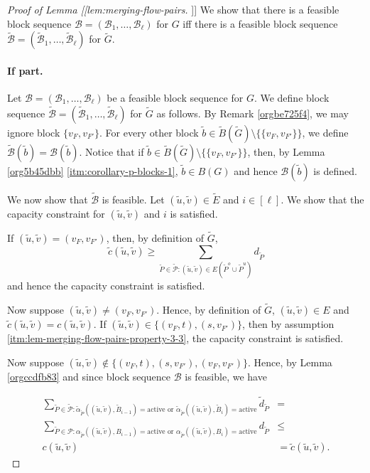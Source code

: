 \documentclass[fontsize=11pt,paper=a4]{book}
\begin{document}
\begin{proof}[Proof of Lemma [[lem:merging-flow-pairs]]]
We show that there is a feasible block sequence \(\mathcal{B}=(\mathscr{B}_1,\dots,\mathscr{B}_{\ell})\) for \(G\) iff there is a feasible block sequence \(\tilde{\mathcal{B}}=(\tilde{\mathscr{B}}_1,\dots,\tilde{\mathscr{B}}_{\ell})\) for \(\tilde{G}\).

\paragraph{If part.}
Let \(\mathcal{B}=(\mathscr{B}_1,\dots,\mathscr{B}_{\ell})\) be a feasible block sequence for \(G\).
We define block sequence \(\tilde{\mathcal{B}}=(\tilde{\mathscr{B}}_1,\dots,\tilde{\mathscr{B}}_{\ell})\) for \(\tilde{G}\) as follows.
By Remark \ref{orgbe725f4}, we may ignore block \(\{v_F,v_{F'}\}\).
For every other block \(\tilde{b}\in\tilde{B}(\tilde{G})\setminus\{\{v_F,v_{F'}\}\}\), we define \(\tilde{\mathcal{B}}(\tilde{b})=\mathcal{B}(\tilde{b})\).
Notice that if \(\tilde{b}\in\tilde{B}(\tilde{G})\setminus\{\{v_F,v_{F'}\}\}\), then, by Lemma \ref{org5b45dbb} \ref{itm:corollary-p-blocks-1}, \(\tilde{b}\in B(G)\) and hence \(\mathcal{B}(\tilde{b})\) is defined.

We now show that \(\tilde{\mathcal{B}}\) is feasible.
Let \((\tilde{u},\tilde{v})\in\tilde{E}\) and \(i\in[\ell]\).
We show that the capacity constraint for \((\tilde{u},\tilde{v})\) and \(i\) is satisfied.

If \((\tilde{u},\tilde{v})=(v_F,v_{F'})\), then, by definition of \(\tilde{G}\),
\[
\tilde{c}(\tilde{u},\tilde{v})\geq\sum_{\tilde{P}\in\tilde{\mathcal{P}}:(\tilde{u},\tilde{v})\in E(\tilde{P}^o\cup\tilde{P}^u)}d_{\tilde{P}}
\]
and hence the capacity constraint is satisfied.

Now suppose \((\tilde{u},\tilde{v})\neq(v_F,v_{F'})\).
Hence, by definition of \(\tilde{G}\), \((\tilde{u},\tilde{v})\in E\) and \(\tilde{c}(\tilde{u},\tilde{v})=c(\tilde{u},\tilde{v})\).
If \((\tilde{u},\tilde{v})\in\{(v_F,t),(s,v_{F'})\}\), then by assumption \ref{itm:lem-merging-flow-pairs-property-3-3}, the capacity constraint is satisfied.

Now suppose \((\tilde{u},\tilde{v})\notin\{(v_F,t),(s,v_{F'}),(v_F,v_{F'})\}\).
Hence, by Lemma \ref{orgccdfb83} and since block sequence \(\mathcal{B}\) is feasible, we have

\begin{align*}
\sum_{\tilde{P}\in\tilde{\mathcal{P}}:\tilde{\alpha}_{\tilde{P}}((\tilde{u},\tilde{v}),\tilde{B}_{i-1})=\mathrm{active}\text{ or }\tilde{\alpha}_{\tilde{P}}((\tilde{u},\tilde{v}),\tilde{B}_i)=\mathrm{active}}\tilde{d}_{\tilde{P}}&=\\
\sum_{\tilde{P}\in\mathcal{P}:\alpha_{\tilde{P}}((\tilde{u},\tilde{v}),B_{i-1})=\mathrm{active}\text{ or }\alpha_{\tilde{P}}((\tilde{u},\tilde{v}),B_i)=\mathrm{active}}d_{\tilde{P}}&\leq\\
c(\tilde{u},\tilde{v})&=
\tilde{c}(\tilde{u},\tilde{v}).
\end{align*}


\end{proof}
\end{document}
